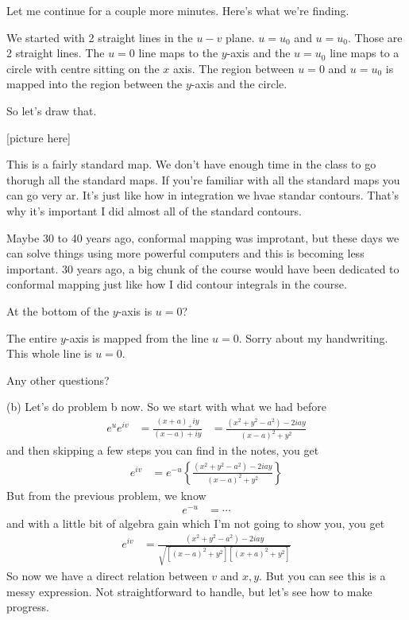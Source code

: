 Let me continue for a couple more minutes.
Here's what we're finding.

We started with 2 straight lines in the $u-v$ plane.
$u=u_0$ and $u=u_0$.
Those are 2 straight lines.
The $u=0$ line maps to the $y$-axis
and the $u=u_0$ line maps to a circle with centre sitting on the $x$ axis.
The region between $u=0$ and $u=u_0$ is mapped into the region between the
$y$-axis and the circle.

So let's draw that.

[picture here]

This is a fairly standard map.
We don't have enough time in the class to go thorugh all the standard maps.
If you're familiar with all the standard maps you can go very ar.
It's just like how in integration we hvae standar contours.
That's why it's important I did almost all of the standard contours.

Maybe 30 to 40 years ago,
conformal mapping was improtant,
but these days we can solve things using more powerful computers and this is
becoming less important.
30 years ago,
a big chunk of the course would have been dedicated to conformal mapping
just like how I did contour integrals in the course.

\begin{question}
    At the bottom of the $y$-axis is $u=0$?
\end{question}
The entire $y$-axis is mapped from the line $u=0$.
Sorry about my handwriting.
This whole line is $u=0$.

Any other questions?

(b)
Let's do problem b now.
So we start with what we had before
\begin{align}
    e^{u}e^{iv}
    &=
    \frac{(x + a) _+ iy}{(x - a) + iy}
    &=
    \frac{(x^2 + y^2 - a^2) - 2 i ay}{(x - a)^2 + y^2}
\end{align}
and then skipping a few steps you can find in the notes,
you get
\begin{align}
    e^{iv} &=
    e^{-u}\left\{
        \frac{(x^2 + y^2 - a^2) - 2 iay}{(x - a)^2 + y^2}
    \right\}
\end{align}
But from the previous problem, we know
\begin{align}
    e^{-u} &= \cdots
\end{align}
and with a little bit of algebra gain which I'm not going to show you,
you get
\begin{align}
    e^{iv} &=
    \frac{(x^2 + y^2 - a^2) - 2iay}{\sqrt{
        [(x - a)^2 + y^2]
        [(x + a)^2 + y^2]
    }}
\end{align}
So now we have a direct relation between $v$ and $x,y$.
But you can see this is a messy expression.
Not straightforward to handle,
but let's see how to make progress.

